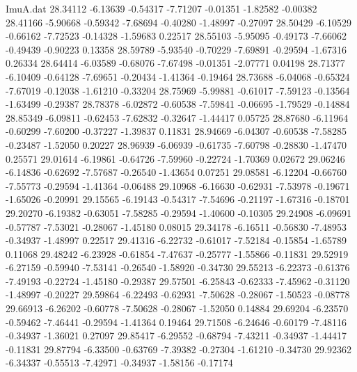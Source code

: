 \begin{filecontents}{ImuA.dat}
  28.34112   -6.13639   -0.54317   -7.71207   -0.01351   -1.82582   -0.00382
  28.41166   -5.90668   -0.59342   -7.68694   -0.40280   -1.48997   -0.27097
  28.50429   -6.10529   -0.66162   -7.72523   -0.14328   -1.59683    0.22517
  28.55103   -5.95095   -0.49173   -7.66062   -0.49439   -0.90223    0.13358
  28.59789   -5.93540   -0.70229   -7.69891   -0.29594   -1.67316    0.26334
  28.64414   -6.03589   -0.68076   -7.67498   -0.01351   -2.07771    0.04198
  28.71377   -6.10409   -0.64128   -7.69651   -0.20434   -1.41364   -0.19464
  28.73688   -6.04068   -0.65324   -7.67019   -0.12038   -1.61210   -0.33204
  28.75969   -5.99881   -0.61017   -7.59123   -0.13564   -1.63499   -0.29387
  28.78378   -6.02872   -0.60538   -7.59841   -0.06695   -1.79529   -0.14884
  28.85349   -6.09811   -0.62453   -7.62832   -0.32647   -1.44417    0.05725
  28.87680   -6.11964   -0.60299   -7.60200   -0.37227   -1.39837    0.11831
  28.94669   -6.04307   -0.60538   -7.58285   -0.23487   -1.52050    0.20227
  28.96939   -6.06939   -0.61735   -7.60798   -0.28830   -1.47470    0.25571
  29.01614   -6.19861   -0.64726   -7.59960   -0.22724   -1.70369    0.02672
  29.06246   -6.14836   -0.62692   -7.57687   -0.26540   -1.43654    0.07251
  29.08581   -6.12204   -0.66760   -7.55773   -0.29594   -1.41364   -0.06488
  29.10968   -6.16630   -0.62931   -7.53978   -0.19671   -1.65026   -0.20991
  29.15565   -6.19143   -0.54317   -7.54696   -0.21197   -1.67316   -0.18701
  29.20270   -6.19382   -0.63051   -7.58285   -0.29594   -1.40600   -0.10305
  29.24908   -6.09691   -0.57787   -7.53021   -0.28067   -1.45180    0.08015
  29.34178   -6.16511   -0.56830   -7.48953   -0.34937   -1.48997    0.22517
  29.41316   -6.22732   -0.61017   -7.52184   -0.15854   -1.65789    0.11068
  29.48242   -6.23928   -0.61854   -7.47637   -0.25777   -1.55866   -0.11831
  29.52919   -6.27159   -0.59940   -7.53141   -0.26540   -1.58920   -0.34730
  29.55213   -6.22373   -0.61376   -7.49193   -0.22724   -1.45180   -0.29387
  29.57501   -6.25843   -0.62333   -7.45962   -0.31120   -1.48997   -0.20227
  29.59864   -6.22493   -0.62931   -7.50628   -0.28067   -1.50523   -0.08778
  29.66913   -6.26202   -0.60778   -7.50628   -0.28067   -1.52050    0.14884
  29.69204   -6.23570   -0.59462   -7.46441   -0.29594   -1.41364    0.19464
  29.71508   -6.24646   -0.60179   -7.48116   -0.34937   -1.36021    0.27097
  29.85417   -6.29552   -0.68794   -7.43211   -0.34937   -1.44417   -0.11831
  29.87794   -6.33500   -0.63769   -7.39382   -0.27304   -1.61210   -0.34730
  29.92362   -6.34337   -0.55513   -7.42971   -0.34937   -1.58156   -0.17174

\end{filecontents}
